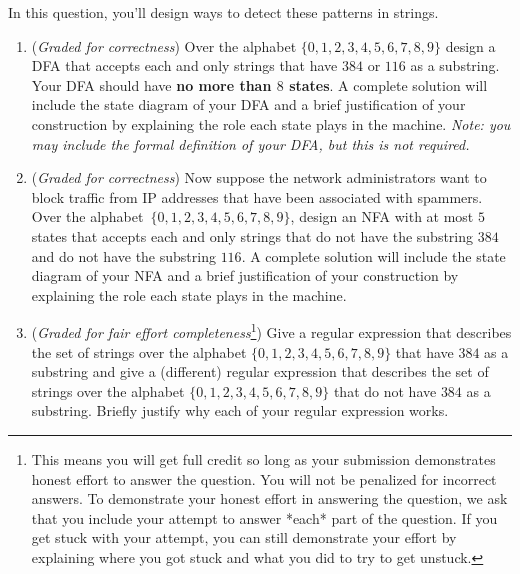 \documentclass[12pt, oneside]{article}
\begin{document}
\begin{enumerate}
In this question, you'll design ways to detect these patterns in strings.

\begin{enumerate}
    \item ({\it Graded for correctness})
    Over the alphabet $\{0,1,2,3,4,5,6,7,8,9\}$ design a DFA that accepts each and only strings
    that have $384$ or $116$ as a substring. Your DFA should have {\bf no more than $8$ states}.
    A complete solution will include the state diagram of your DFA and a brief justification of
    your construction by explaining the role each state plays in the machine. {\it Note: you may 
    include the formal definition of your DFA, but this is not required.} 
    \item ({\it Graded for correctness})
    Now suppose the network administrators want to block traffic from IP addresses
    that have been associated with spammers. Over the alphabet~$\{0,1,2,3,4,5,6,7,8,9\}$, 
    design an NFA with at most $5$ states that accepts each and only strings
    that do not have the substring $384$ and do not have the substring $116$. 
    A complete solution will include the state diagram of your NFA and a brief justification 
    of your construction by explaining the role each state plays in the machine.
    \item ({\it Graded for fair effort completeness}\footnote{This means 
    you will get full credit so long as your submission demonstrates honest 
    effort to answer the question. You will not be penalized for incorrect answers. 
    To demonstrate your honest effort in answering the question, we ask that you 
    include your attempt to answer *each* part of the question. If you get stuck 
    with your attempt, you can still demonstrate your effort by explaining where 
    you got stuck and what you did to try to get unstuck.})
    Give a regular expression that describes the set of strings over 
    the alphabet $\{0,1,2,3,4,5,6,7,8,9\}$ that have $384$ as a substring and give
    a (different) regular expression that describes the set of strings over
    the alphabet $\{0,1,2,3,4,5,6,7,8,9\}$ that do not have $384$ as a substring. Briefly justify
    why each of your regular expression works.
\end{enumerate}


\end{enumerate}
\end{document}
